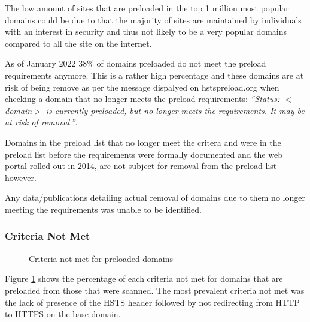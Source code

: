 \documentclass{mscreport}
\begin{document}
\vspace{0.3cm} \noindent
The low amount of sites that are preloaded in the top 1 million most popular domains could be due to that the majority of sites are maintained by individuals with an interest in security and thus not likely to be a very popular domains compared to all the site on the internet.

\vspace{0.3cm} \noindent
As of January 2022 38\% of domains preloaded do not meet the preload requirements anymore. This is a rather high percentage and these domains are at risk of being remove as per the message dispalyed on hstspreload.org when checking a domain that no longer meets the preload requirements: \textit{``Status: $<$domain$>$ is currently preloaded, but no longer meets the requirements. It may be at risk of removal.''}.

\vspace{0.3cm} \noindent
Domains in the preload list that no longer meet the critera and were in the preload list before the requirements were formally documented and the web portal rolled out in 2014, are not subject for removal from the preload list however.

\vspace{0.3cm} \noindent
Any data/publications detailing actual removal of domains due to them no longer meeting the requirements was unable to be identified.

\subsubsection{Criteria Not Met}

\begin{figure}[t]
	\begin{center}
		\caption{Criteria not met for preloaded domains}
		\label{fig:hsts_preloaded_criteria_not_met}
	\end{center}
\end{figure}


\vspace{0.3cm} \noindent
Figure \ref{fig:hsts_preloaded_criteria_not_met} shows the percentage of each criteria not met for domains that are preloaded from those that were scanned. The most prevalent criteria not met  was the lack of presence of the HSTS header followed by not redirecting from HTTP to HTTPS on the base domain.
\end{document}

